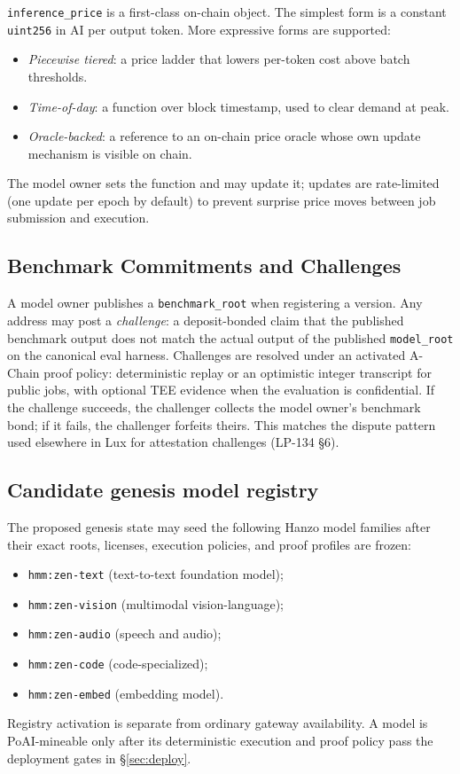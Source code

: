 \texttt{inference\_price} is a first-class on-chain object. The simplest
form is a constant \texttt{uint256} in AI per output token. More
expressive forms are supported:

\begin{itemize}[leftmargin=1.2em]
  \item \emph{Piecewise tiered}: a price ladder that lowers per-token
        cost above batch thresholds.
  \item \emph{Time-of-day}: a function over block timestamp, used to
        clear demand at peak.
  \item \emph{Oracle-backed}: a reference to an on-chain price oracle
        whose own update mechanism is visible on chain.
\end{itemize}

The model owner sets the function and may update it; updates are
rate-limited (one update per epoch by default) to prevent surprise
price moves between job submission and execution.

\subsection{Benchmark Commitments and Challenges}

A model owner publishes a \texttt{benchmark\_root} when registering a
version. Any address may post a \emph{challenge}: a deposit-bonded
claim that the published benchmark output does not match the actual
output of the published \texttt{model\_root} on the canonical eval
harness. Challenges are resolved under an activated A-Chain proof policy:
deterministic replay or an optimistic integer transcript for public jobs, with
optional TEE evidence when the evaluation is confidential. If the
challenge succeeds, the challenger collects the model owner's
benchmark bond; if it fails, the challenger forfeits theirs. This
matches the dispute pattern used elsewhere in Lux for attestation
challenges (LP-134 §6).

\subsection{Candidate genesis model registry}

The proposed genesis state may seed the following Hanzo model families after
their exact roots, licenses, execution policies, and proof profiles are frozen:

\begin{itemize}[leftmargin=1.2em]
  \item \texttt{hmm:zen-text} (text-to-text foundation model);
  \item \texttt{hmm:zen-vision} (multimodal vision-language);
  \item \texttt{hmm:zen-audio} (speech and audio);
  \item \texttt{hmm:zen-code} (code-specialized);
  \item \texttt{hmm:zen-embed} (embedding model).
\end{itemize}

Registry activation is separate from ordinary gateway availability. A model is
PoAI-mineable only after its deterministic execution and proof policy pass the
deployment gates in \S\ref{sec:deploy}.
